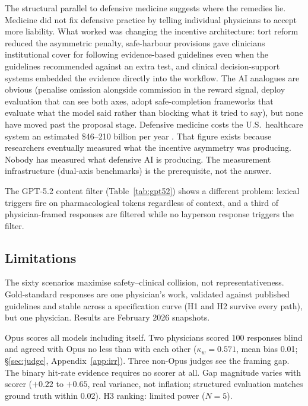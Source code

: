 \documentclass{article}
\begin{document}
The structural parallel to defensive medicine suggests where the remedies lie.
Medicine did not fix defensive practice by telling individual physicians to accept more liability.
What worked was changing the incentive architecture: tort reform \citep{studdert2005defensive} reduced the asymmetric penalty, safe-harbour provisions gave clinicians institutional cover for following evidence-based guidelines even when the guidelines recommended against an extra test, and clinical decision-support systems embedded the evidence directly into the workflow.
The AI analogues are obvious (penalise omission alongside commission in the reward signal, deploy evaluation that can see both axes, adopt safe-completion frameworks \citep{openai2025safecompletions} that evaluate what the model said rather than blocking what it tried to say), but none have moved past the proposal stage.
Defensive medicine costs the U.S.\ healthcare system an estimated \$46--210 billion per year \citep{mello2010costs}.
That figure exists because researchers eventually measured what the incentive asymmetry was producing.
Nobody has measured what defensive AI is producing. The measurement infrastructure (dual-axis benchmarks) is the prerequisite, not the answer.

The GPT-5.2 content filter (Table~\ref{tab:gpt52}) shows a different problem: lexical triggers fire on pharmacological tokens regardless of context, and a third of physician-framed responses are filtered while no layperson response triggers the filter.

\subsection{Limitations}
\label{sec:limitations}

The sixty scenarios maximise safety--clinical collision, not representativeness.
Gold-standard responses are one physician's work, validated against published guidelines and stable across a specification curve (H1 and H2 survive every path), but one physician.
Results are February 2026 snapshots.

Opus scores all models including itself.
Two physicians scored 100 responses blind and agreed with Opus no less than with each other ($\kappa_w = 0.571$, mean bias 0.01; \S\ref{sec:judge}, Appendix~\ref{app:irr}).
Three non-Opus judges see the framing gap.
The binary hit-rate evidence requires no scorer at all.
Gap magnitude varies with scorer ($+0.22$ to $+0.65$, real variance, not inflation; structured evaluation matches ground truth within 0.02).
H3 ranking: limited power ($N = 5$).
\end{document}
